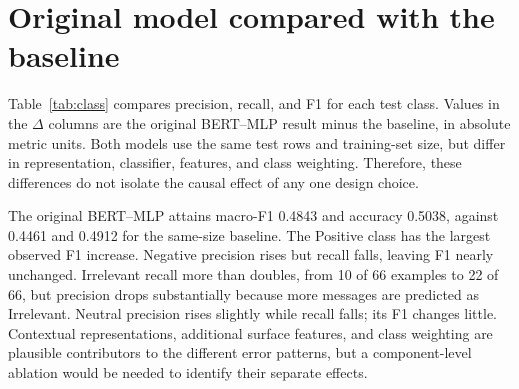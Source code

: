 \section{Original model compared with the baseline}
Table~\ref{tab:class} compares precision, recall, and F1 for each test class. Values in the $\Delta$ columns are the original BERT--MLP result minus the baseline, in absolute metric units. Both models use the same test rows and training-set size, but differ in representation, classifier, features, and class weighting. Therefore, these differences do not isolate the causal effect of any one design choice.

\begin{table}[htbp]
\centering
\caption{Test metrics for the 473-row TF--IDF baseline and original BERT--MLP.}
\label{tab:class}
\end{table}

The original BERT--MLP attains macro-F1 0.4843 and accuracy 0.5038, against 0.4461 and 0.4912 for the same-size baseline. The Positive class has the largest observed F1 increase. Negative precision rises but recall falls, leaving F1 nearly unchanged. Irrelevant recall more than doubles, from 10 of 66 examples to 22 of 66, but precision drops substantially because more messages are predicted as Irrelevant. Neutral precision rises slightly while recall falls; its F1 changes little. Contextual representations, additional surface features, and class weighting are plausible contributors to the different error patterns, but a component-level ablation would be needed to identify their separate effects.

